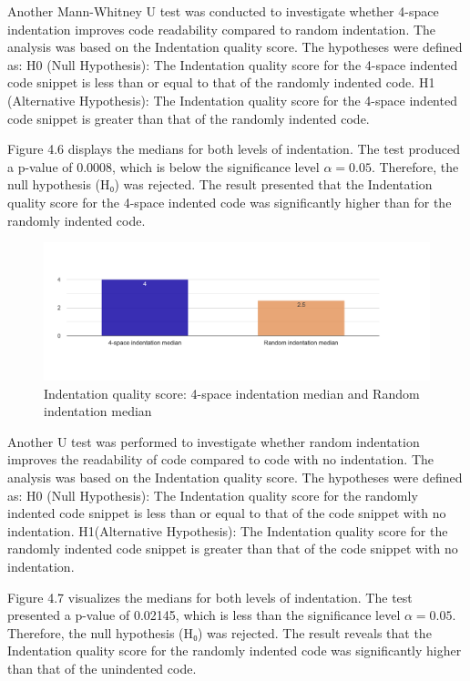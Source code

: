 Another Mann-Whitney U test was conducted to investigate whether 4-space indentation improves code readability compared to random indentation. The analysis was based on the Indentation quality score. The hypotheses were defined as:  H0 (Null Hypothesis): The Indentation quality score for the 4-space indented code snippet is less than or equal to that of the randomly indented code. H1 (Alternative Hypothesis): The Indentation quality score for the 4-space indented code snippet is greater than that of the randomly indented code.


Figure 4.6 displays the medians for both levels of indentation. 
The test produced a p-value of 0.0008, which is below the significance level \(\alpha = 0.05\). Therefore, the null hypothesis (H₀) was rejected. The result presented that the Indentation quality score for the 4-space indented code was significantly higher than for the randomly indented code.

\begin{figure} [H]
  \centering
  \includegraphics[scale=0.4]{figures/4-r-q5.png}
  \caption{Indentation quality score: 4-space indentation median and Random indentation median}
  \label{fig:AnhangsChor}
\end{figure}


Another  U test was performed to investigate whether random indentation improves the readability of code compared to code with no indentation. The analysis was based on the Indentation quality score. The hypotheses were defined as:  H0 (Null Hypothesis): The Indentation quality score for the randomly indented code snippet is less than or equal to that of the code snippet with no indentation.  H1(Alternative Hypothesis): The Indentation quality score for the randomly indented code snippet is greater than that of the code snippet with no indentation.

Figure 4.7 visualizes the medians for both levels of indentation. 
The test presented a p-value of  0.02145, which is less than the significance level \(\alpha = 0.05\). Therefore, the null hypothesis (H₀) was rejected. The result reveals that the Indentation quality score for the randomly indented code was significantly higher than that of the unindented code.

